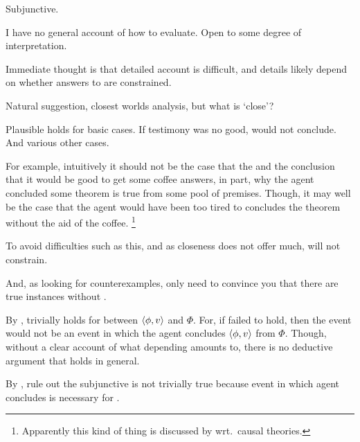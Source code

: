 \begin{note}
  Subjunctive.

  I have no general account of how to evaluate.
  Open to some degree of interpretation.

  Immediate thought is that detailed account is difficult, and details likely depend on whether answers to \qWhyVnP{} are constrained.

  Natural suggestion, closest worlds analysis, but what is `close'?

  Plausible holds for basic cases.
  If testimony was no good, would not conclude.
  And various other cases.

  For example, intuitively it should not be the case that the \ros{} and the conclusion that it would be good to get some coffee answers, in part, why the agent concluded some theorem is true from some pool of premises.
  Though, it may well be the case that the agent would have been too tired to concludes the theorem without the aid of the coffee.%
  \footnote{
    Apparently this kind of thing is discussed by \textcite{Moore:1962up} wrt.\ causal theories.
  }

  To avoid difficulties such as this, and as closeness does not offer much, will not constrain.

  And, as looking for counterexamples, only need to convince you that there are true instances without .
\end{note}


\begin{note}
  By \supportI{}, trivially holds for \ros{} between \(\langle \phi, v \rangle\) and \(\Phi\).
  For, if \support{} failed to hold, then the event would not be an event in which the agent concludes \(\langle \phi, v \rangle\) from \(\Phi\).
  Though, without a clear account of what depending amounts to, there is no deductive argument that holds in general.

  By \supportII{}, rule out the subjunctive is not trivially true because event in which agent concludes is necessary for \ros{}.
\end{note}

